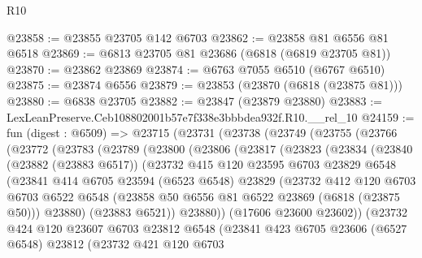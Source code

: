 \begin{lexlean}{R10}
\begin{coremodule}
@23858 := @23855 @23705 @142 @6703
@23862 := @23858 @81 @6556 @81 @6518
@23869 := @6813 @23705 @81 @23686 (@6818 (@6819 @23705 @81))
@23870 := @23862 @23869
@23874 := @6763 @7055 @6510 (@6767 @6510)
@23875 := @23874 @6556
@23879 := @23853 (@23870 (@6818 (@23875 @81)))
@23880 := @6838 @23705
@23882 := @23847 (@23879 @23880)
@23883 := LexLeanPreserve.Ceb108802001b57e7f338e3bbbdea932f.R10.__rel_10
@24159 := fun (digest : @6509) =>
  @23715
    (@23731
      (@23738
        (@23749
          (@23755
            (@23766
              (@23772
                (@23783
                  (@23789
                    (@23800
                      (@23806
                        (@23817
                          (@23823
                            (@23834
                              (@23840
                                (@23882 (@23883 @6517))
                                (@23732
                                  @415
                                  @120
                                  @23595
                                  @6703
                                  @23829
                                  @6548
                                  (@23841
                                    @414
                                    @6705
                                    @23594
                                    (@6523 @6548)
                                    @23829
                                    (@23732
                                      @412
                                      @120
                                      @6703
                                      @6703
                                      @6522
                                      @6548
                                      (@23858 @50 @6556 @81 @6522 @23869 (@6818 (@23875 @50)))
                                      @23880)
                                    (@23883 @6521))
                                  @23880))
                              (@17606 @23600 @23602))
                            (@23732
                              @424
                              @120
                              @23607
                              @6703
                              @23812
                              @6548
                              (@23841
                                @423
                                @6705
                                @23606
                                (@6527 @6548)
                                @23812
                                (@23732
                                  @421
                                  @120
                                  @6703

\end{coremodule}
\end{lexlean}
